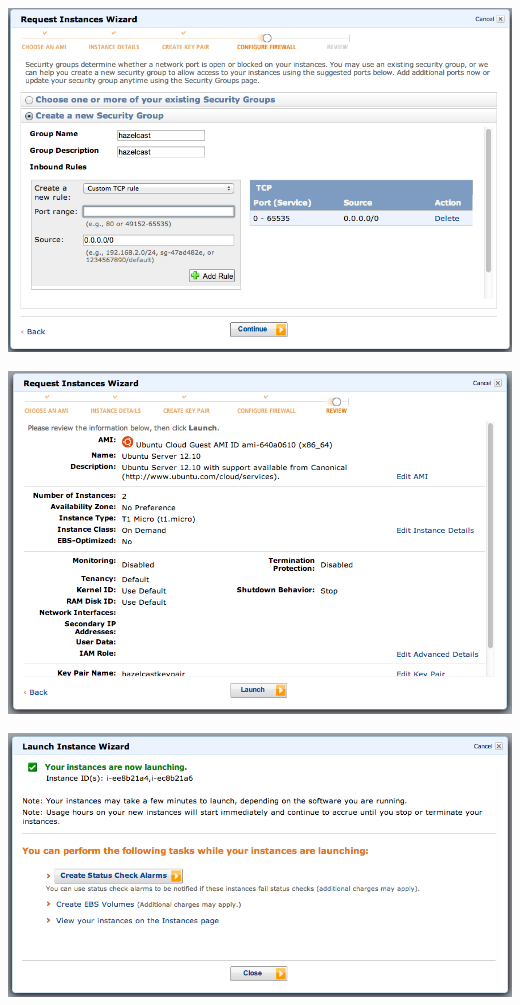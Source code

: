\includegraphics[scale=0.30]{ec2-8.png}

\includegraphics[scale=0.30]{ec2-9.png}

\includegraphics[scale=0.30]{ec2-10.png}